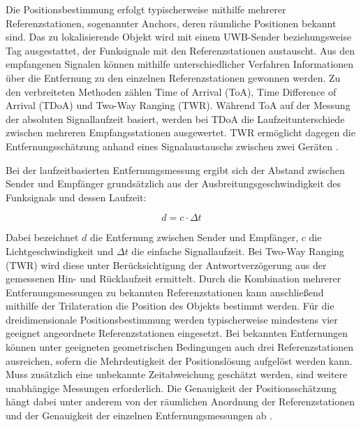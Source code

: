Die Positionsbestimmung erfolgt typischerweise mithilfe mehrerer Referenzstationen, sogenannter Anchors, deren räumliche Positionen bekannt sind. Das zu lokalisierende Objekt wird mit einem UWB-Sender beziehungsweise Tag ausgestattet, der Funksignale mit den Referenzstationen austauscht. Aus den empfangenen Signalen können mithilfe unterschiedlicher Verfahren Informationen über die Entfernung zu den einzelnen Referenzstationen gewonnen werden. Zu den verbreiteten Methoden zählen Time of Arrival (ToA), Time Difference of Arrival (TDoA) und Two-Way Ranging (TWR). Während ToA auf der Messung der absoluten Signallaufzeit basiert, werden bei TDoA die Laufzeitunterschiede zwischen mehreren Empfangsstationen ausgewertet. TWR ermöglicht dagegen die Entfernungsschätzung anhand eines Signalaustauschs zwischen zwei Geräten \cite{Elsanhoury2022}.

Bei der laufzeitbasierten Entfernungsmessung ergibt sich der Abstand zwischen Sender und Empfänger grundsätzlich aus der Ausbreitungsgeschwindigkeit des Funksignals und dessen Laufzeit:

\begin{equation}
    d = c \cdot \Delta t
    \label{eq:uwb_distance}
\end{equation}

Dabei bezeichnet \(d\) die Entfernung zwischen Sender und Empfänger, \(c\) die Lichtgeschwindigkeit und \(\Delta t\) die einfache Signallaufzeit. Bei Two-Way Ranging (TWR) wird diese unter Berücksichtigung der Antwortverzögerung aus der gemessenen Hin- und Rücklaufzeit ermittelt. Durch die Kombination mehrerer Entfernungsmessungen zu bekannten Referenzstationen kann anschließend mithilfe der Trilateration die Position des Objekts bestimmt werden. Für die dreidimensionale Positionsbestimmung werden typischerweise mindestens vier geeignet angeordnete Referenzstationen eingesetzt. Bei bekannten Entfernungen können unter geeigneten geometrischen Bedingungen auch drei Referenzstationen ausreichen, sofern die Mehrdeutigkeit der Positionslösung aufgelöst werden kann. Muss zusätzlich eine unbekannte Zeitabweichung geschätzt werden, sind weitere unabhängige Messungen erforderlich. Die Genauigkeit der Positionsschätzung hängt dabei unter anderem von der räumlichen Anordnung der Referenzstationen und der Genauigkeit der einzelnen Entfernungsmessungen ab
\cite{Elsanhoury2022}.


